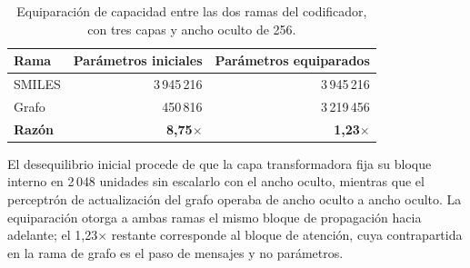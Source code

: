 \begin{table}[htbp]
  \centering
  \caption{Equiparación de capacidad entre las dos ramas del codificador,
           con tres capas y ancho oculto de 256.}
  \label{tab:a4-capacidad}
  \small
  \begin{tabular}{@{}lrr@{}}
    \toprule
    Rama & Parámetros iniciales & Parámetros equiparados \\
    \midrule
    SMILES & 3\,945\,216 & 3\,945\,216 \\
    Grafo  &   450\,816 & 3\,219\,456 \\
    \midrule
    \textbf{Razón} & \textbf{8,75}$\times$ & \textbf{1,23}$\times$ \\
    \bottomrule
  \end{tabular}

  \vspace{0.5em}
  \begin{minipage}{0.92\textwidth}
    \footnotesize
    El desequilibrio inicial procede de que la capa transformadora fija su bloque
    interno en 2\,048 unidades sin escalarlo con el ancho oculto, mientras que el
    perceptrón de actualización del grafo operaba de ancho oculto a ancho oculto. La
    equiparación otorga a ambas ramas el mismo bloque de propagación hacia adelante; el
    1,23$\times$ restante corresponde al bloque de atención, cuya contrapartida en la
    rama de grafo es el paso de mensajes y no parámetros.
  \end{minipage}
\end{table}



